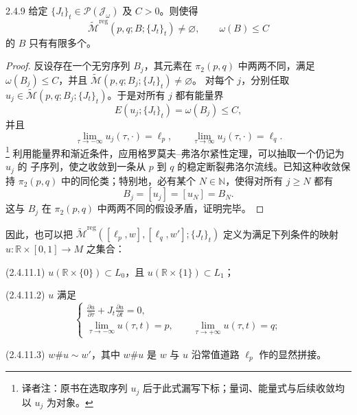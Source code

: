 \begin{proposition}{2.4.9}\label{prop:2-4-9}
给定 $\{J_t\}_t\in\mathcal P(\mathcal J_\omega)$ 及 $C>0$。则使得
\[
  \widetilde{\mathcal M}^{\mathrm{reg}}(p,q;B;\{J_t\}_t)\neq\varnothing,
  \qquad \omega(B)\leq C
\]
的 $B$ 只有有限多个。
\end{proposition}

\begin{proof}
反设存在一个无穷序列 $B_j$，其元素在 $\pi_2(p,q)$ 中两两不同，满足
$\omega(B_j)\leq C$，并且
$\widetilde{\mathcal M}(p,q;B_j;\{J_t\}_t)\neq\varnothing$。
对每个 $j$，分别任取
$u_j\in\widetilde{\mathcal M}(p,q;B_j;\{J_t\}_t)$。于是对所有 $j$ 都有能量界
\[
  E(u_j;\{J_t\}_t)=\omega(B_j)\leq C,
\]
并且
\begin{equation}
  \lim_{\tau\to-\infty}u_j(\tau,\mathord\cdot)=\ell_p,
  \qquad
  \lim_{\tau\to\infty}u_j(\tau,\mathord\cdot)=\ell_q.
  \tag{2.4.10}\label{eq:2-4-10}
\end{equation}
\footnote{译者注：原书在选取序列 $u_j$ 后于此式漏写下标；量词、能量式与后续收敛均以 $u_j$ 为对象。}
利用能量界和渐近条件，应用格罗莫夫--弗洛尔紧性定理，可以抽取一个仍记为 $u_j$ 的
子序列，使之收敛到一条从 $p$ 到 $q$ 的稳定断裂弗洛尔流线。已知这种收敛保持
$\pi_2(p,q)$ 中的同伦类；特别地，必有某个 $N\in\mathbb N$，使得对所有
$j\geq N$ 都有
\[
  B_j=[u_j]=[u_N]=B_N.
\]
这与 $B_j$ 在 $\pi_2(p,q)$ 中两两不同的假设矛盾，证明完毕。
\end{proof}

因此，也可以把
$\widetilde{\mathcal M}^{\mathrm{reg}}
([\ell_p,w],[\ell_q,w'];\{J_t\}_t)$
定义为满足下列条件的映射 $u:\mathbb R\times[0,1]\to M$ 之集合：

\par\smallskip\noindent\textup{(2.4.11.1)}\quad
$u(\mathbb R\times\{0\})\subset L_0$，且
$u(\mathbb R\times\{1\})\subset L_1$；

\par\smallskip\noindent\textup{(2.4.11.2)}\quad
$u$ 满足
\[
  \begin{cases}
    \displaystyle\frac{\partial u}{\partial\tau}
      +J_t\frac{\partial u}{\partial t}=0,\\[6pt]
    \displaystyle\lim_{\tau\to-\infty}u(\tau,t)=p,
      \qquad\displaystyle\lim_{\tau\to+\infty}u(\tau,t)=q;
  \end{cases}
\]

\par\smallskip\noindent\textup{(2.4.11.3)}\quad
$w\#u\sim w'$，其中 $w\#u$ 是 $w$ 与 $u$ 沿常值道路 $\ell_p$ 作的显然拼接。


